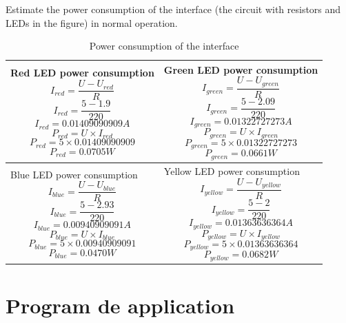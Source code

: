 \documentclass[10pt]{article}
\begin{document}
Estimate the power consumption of the interface (the circuit with resistors and
LEDs in the figure) in normal operation.
\begin{table}[!h]
    \centering
    \begin{tabular}{p{}|p{}}
        Red LED power consumption
        \[I_{red} = \frac{U - U_{red}}{R}\]
        \[I_{red} = \frac{5 - 1.9}{220}\]
        \[I_{red} =  0.01409090909 A\]
        \[P_{red} = U \times I_{red}\]
        \[P_{red} = 5 \times 0.01409090909\]
        \[P_{red} = 0.0705 W\]
        &
        Green LED power consumption
        \[I_{green} = \frac{U - U_{green}}{R}\]
        \[I_{green} = \frac{5 - 2.09}{220}\]
        \[I_{green} = 0.01322727273 A\]
        \[P_{green} = U \times I_{green}\]
        \[P_{green} = 5 \times 0.01322727273\]
        \[P_{green} = 0.0661 W\]
        \\ \hline
        Blue LED power consumption
        \[I_{blue} = \frac{U - U_{blue}}{R}\]
        \[I_{blue} = \frac{5 - 2.93}{220}\]
        \[I_{blue} = 0.00940909091 A\]
        \[P_{blue} = U \times I_{blue}\]
        \[P_{blue} = 5 \times 0.00940909091\]
        \[P_{blue} = 0.0470 W\]
        &
        Yellow LED power consumption
        \[I_{yellow} = \frac{U - U_{yellow}}{R}\]
        \[I_{yellow} = \frac{5 - 2}{220}\]
        \[I_{yellow} = 0.01363636364 A\]
        \[P_{yellow} = U \times I_{yellow}\]
        \[P_{yellow} = 5 \times 0.01363636364\]
        \[P_{yellow} = 0.0682 W\] \\
    \end{tabular}
    \caption{Power consumption of the interface}
\end{table}

\newpage

\section{Program de application}

\inputminted{arduino}{../lab1.ino}
\end{document}
